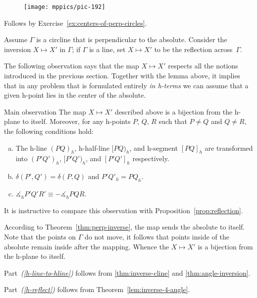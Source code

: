 \begin{figure}
\vskip-4mm
\centering
\texttt{[image: mppics/pic-192]}
\end{figure}

Follows by Exercise~\ref{ex:centers-of-perp-circles}.
\qeds

Assume $\Gamma$ is a circline that is perpendicular to the absolute.
Consider the inversion $X\mapsto X'$
in $\Gamma$; 
if $\Gamma$ is a line,
set $X\mapsto X'$ to be the reflection across~$\Gamma$.

The following observation says that the map $X\mapsto X'$ respects all the notions introduced in the previous section.
Together with the lemma above, it implies that in any problem that is formulated entirely {}\emph{in h-terms} we can assume that a given h-point lies in the center of the absolute.

\begin{thm}{Main observation}\label{thm:main-observ}
The map $X\mapsto X'$ described above is a bijection from the h-plane to itself. 
Moreover, for any h-points $P$, $Q$, $R$ such that $P\ne Q$ and $Q\ne R$, the following conditions hold:
\begin{enumerate}[(a)]
\item\label{h-line-to-hline} The h-line $(PQ)_h$, h-half-line $[PQ)_h$, and h-segment $[PQ]_h$ are transformed into $(P'Q')_h$, $[P'Q')_h$, and $[P'Q']_h$ respectively.
\item\label{h-reflect} $\delta(P',Q')=\delta(P,Q)$ and $P'Q'_h=PQ_h$.
\item\label{h-angle-mes} 
$\measuredangle_h P'Q'R'\equiv-\measuredangle_h PQR$.
\end{enumerate}

\end{thm}

It is instructive to compare this observation with Proposition~\ref{prop:reflection}.

According to Theorem~\ref{thm:perp-inverse}, the map sends the absolute to itself. 
Note that the points on $\Gamma$ do not move, it follows that points inside of the absolute remain inside after the mapping.
Whence the $X\mapsto X'$ is a bijection from the h-plane to itself.


Part~\textit{(\ref{h-line-to-hline})} follows from \ref{thm:inverse-cline} and \ref{thm:angle-inversion}.

Part~\textit{(\ref{h-reflect})} follows from Theorem~\ref{lem:inverse-4-angle}.

